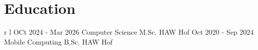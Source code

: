 
\section{Education}\label{sec: schulische-laufbahn}

\begin{supertabular}{r l} %
    \qualificationentry
    {OCt 2024 - Mar 2026}
    {Computer Science M.Sc.}
    {}
    {}
    {HAW Hof}
    \qualificationentry
    {Oct 2020 - Sep 2024}
    {Mobile Computing B.Sc.}
    {}
    {}
    {HAW Hof}
\end{supertabular}
